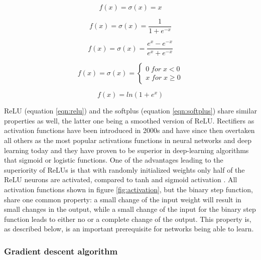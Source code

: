 \begin{equation}
 f(x) = \sigma(x) = x
 \label{eqn:ident}
\end{equation}
       
\begin{equation}
 f(x) = \sigma(x) = \frac{1}{1+e^{-x}} 
 \label{eqn:sigmoid}
\end{equation}

\begin{equation}
 f(x) = \sigma(x) = \frac{e^x - e^{-x}}{e^x + e^{-x}}
 \label{eqn:tanh}
\end{equation}

\begin{equation}
  f(x)= \sigma(x) = \left\{
 \begin{array}{ll}
  0 \; for \; x < 0 \\ 
  x \; for \; x \geq 0
 \end{array}
\right .
\label{eqn:relu}
\end{equation}

\begin{equation}
  f(x) = ln(1+e^x)
 \label{eqn:softplus}
\end{equation}

ReLU (equation \ref{eqn:relu}) and the softplus (equation \ref{eqn:softplus}) share similar properties as well, the
latter one being a smoothed version of ReLU. Rectifiers as activation functions have been introduced in 2000s
\cite{hahnloser2000digital} and have since then overtaken all others as the most popular activations functions in neural
networks and deep learning today \cite{lecun2015deep} and they have proven to be superior in deep-learning algorithms
that sigmoid or logistic functions. One of the advantages leading to the superiority of ReLUs is that with randomly
initialized weights only half of the ReLU neurons are activated, compared to tanh and sigmoid activation
\cite{glorot2011deep}. All activation functions shown in figure \ref{fig:activation}, but the binary step function,
share one common property: a small change of the input weight will result in small changes in the output, while a small
change of the input for the binary step function leads to either no or a complete change of the output. This property
is, as described below, is an
important prerequisite for networks being able to learn. \\

\subsubsection{Gradient descent algorithm}

